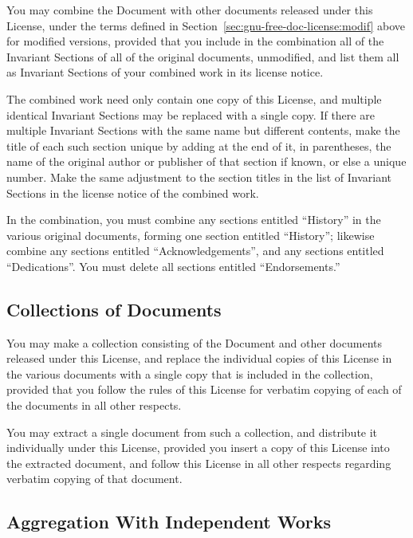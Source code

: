 \documentclass[11pt,a4paper,oneside]{article}
\begin{document}
You may combine the Document with other documents released under this
License, under the terms defined in
Section~\ref{sec:gnu-free-doc-license:modif} above for modified
versions, provided that you include in the combination all of the
Invariant Sections of all of the original documents, unmodified, and
list them all as Invariant Sections of your combined work in its license
notice.

The combined work need only contain one copy of this License, and
multiple identical Invariant Sections may be replaced with a single
copy.  If there are multiple Invariant Sections with the same name but
different contents, make the title of each such section unique by adding
at the end of it, in parentheses, the name of the original author or
publisher of that section if known, or else a unique number.  Make the
same adjustment to the section titles in the list of Invariant Sections
in the license notice of the combined work.

In the combination, you must combine any sections entitled ``History''
in the various original documents, forming one section entitled
``History''; likewise combine any sections entitled
``Acknowledgements'', and any sections entitled ``Dedications''.  You
must delete all sections entitled ``Endorsements.''


\subsection{Collections of Documents}
\label{sec:gnu-free-doc-license:coll-docum}

You may make a collection consisting of the Document and other documents
released under this License, and replace the individual copies of this
License in the various documents with a single copy that is included in
the collection, provided that you follow the rules of this License for
verbatim copying of each of the documents in all other respects.

You may extract a single document from such a collection, and distribute
it individually under this License, provided you insert a copy of this
License into the extracted document, and follow this License in all
other respects regarding verbatim copying of that document.


\subsection{Aggregation With Independent Works}
\label{sec:gnu-free-doc-license:aggr-with-indep-works}
\end{document}
